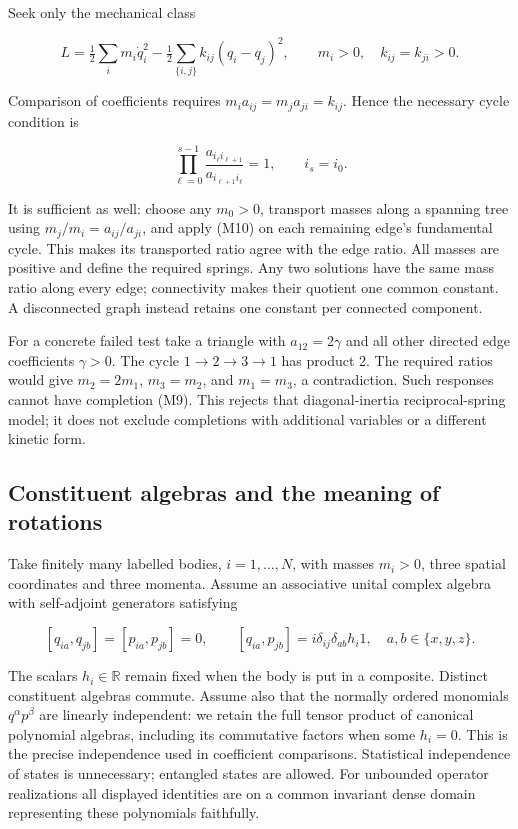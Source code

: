 \documentclass[11pt,a4paper]{article}
\begin{document}
Seek only the mechanical class

\[L=\tfrac12\sum_i m_i\dot q_i^2
-\tfrac12\sum_{\{i,j\}}k_{ij}(q_i-q_j)^2,
\qquad m_i>0,\quad k_{ij}=k_{ji}>0. \tag{M9}\]

Comparison of coefficients requires \(m_i a_{ij}=m_j a_{ji}=k_{ij}\).
Hence the necessary cycle condition is

\[\prod_{\ell=0}^{s-1}
\frac{a_{i_\ell i_{\ell+1}}}{a_{i_{\ell+1}i_\ell}}=1,
\qquad i_s=i_0. \tag{M10}\]

It is sufficient as well: choose any \(m_0>0\), transport masses along a
spanning tree using \(m_j/m_i=a_{ij}/a_{ji}\), and apply (M10) on each
remaining edge's fundamental cycle. This makes its transported ratio
agree with the edge ratio. All masses are positive and define the
required springs. Any two solutions have the same mass ratio along every
edge; connectivity makes their quotient one common constant. A
disconnected graph instead retains one constant per connected component.

For a concrete failed test take a triangle with \(a_{12}=2\gamma\) and
all other directed edge coefficients \(\gamma>0\). The cycle
\(1\to2\to3\to1\) has product 2. The required ratios would give
\(m_2=2m_1\), \(m_3=m_2\), and \(m_1=m_3\), a contradiction. Such
responses cannot have completion (M9). This rejects that
diagonal-inertia reciprocal-spring model; it does not exclude
completions with additional variables or a different kinetic form.

\hypertarget{constituent-algebras-and-the-meaning-of-rotations}{%
\subsection{Constituent algebras and the meaning of
rotations}\label{constituent-algebras-and-the-meaning-of-rotations}}

Take finitely many labelled bodies, \(i=1,\ldots,N\), with masses
\(m_i>0\), three spatial coordinates and three momenta. Assume an
associative unital complex algebra with self-adjoint generators
satisfying

\[
[q_{ia},q_{jb}]=[p_{ia},p_{jb}]=0,\qquad
[q_{ia},p_{jb}]=i\delta_{ij}\delta_{ab}h_i1,
\quad a,b\in\{x,y,z\}. \tag{A1}
\]

The scalars \(h_i\in\mathbb R\) remain fixed when the body is put in a
composite. Distinct constituent algebras commute. Assume also that the
normally ordered monomials \(q^\alpha p^\beta\) are linearly
independent: we retain the full tensor product of canonical polynomial
algebras, including its commutative factors when some \(h_i=0\). This is
the precise independence used in coefficient comparisons. Statistical
independence of states is unnecessary; entangled states are allowed. For
unbounded operator realizations all displayed identities are on a common
invariant dense domain representing these polynomials faithfully.
\end{document}
